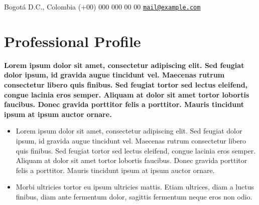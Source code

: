\documentclass[overlapped,line,final]{res}
\begin{document}

\begin{resume}


	\begin{minipage}{0.5\linewidth}
    		Bogotá D.C., Colombia \newline
    		(+00) 000 000 00 00 \newline
		{\tt \href{mailto:mail@example.com}{mail@example.com}}
	\end{minipage}
\vspace{0.5cm}
\section{\sc Professional Profile}
\vspace{0.5cm}

	\textbf {Lorem ipsum dolor sit amet, consectetur adipiscing elit. Sed feugiat dolor ipsum, id gravida augue tincidunt vel. Maecenas rutrum consectetur libero quis finibus. Sed feugiat tortor sed lectus eleifend, congue lacinia eros semper. Aliquam at dolor sit amet tortor lobortis faucibus. Donec gravida porttitor felis a porttitor. Mauris tincidunt ipsum at ipsum auctor ornare. }

\vspace{2mm}
\begin{itemize} 
    \item Lorem ipsum dolor sit amet, consectetur adipiscing elit. Sed feugiat dolor ipsum, id gravida augue tincidunt vel. Maecenas rutrum consectetur libero quis finibus. Sed feugiat tortor sed lectus eleifend, congue lacinia eros semper. Aliquam at dolor sit amet tortor lobortis faucibus. Donec gravida porttitor felis a porttitor. Mauris tincidunt ipsum at ipsum auctor ornare.  
    \item Morbi ultricies tortor eu ipsum ultricies mattis. Etiam ultrices, diam a luctus finibus, diam ante fermentum dolor, sagittis fermentum neque eros non odio. 
\end{itemize}

\vspace{0.5cm}

\end{resume}
\end{document}
